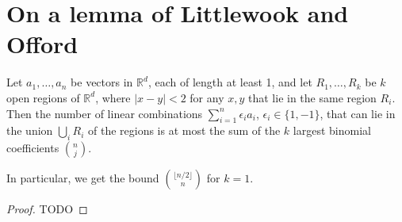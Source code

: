 \chapter{On a lemma of Littlewook and Offord}

\begin{theorem}
  \label{ch25theorem}
  Let $a_1, \dots, a_n$ be vectors in $\mathbb{R}^d$, each of length at least 1,
  and let $R_1, \dots, R_k$ be $k$ open regions of $\mathbb{R}^d$, where $|x - y| < 2$
  for any $x, y$ that lie in the same region $R_i$. Then the number of linear
  combinations $\sum_{i=1}^{n} \epsilon_i a_i$, $\epsilon_i \in \{1, -1\}$,
  that can lie in the union $\bigcup_i R_i$ of the regions is at most the sum of
  the $k$ largest binomial coefficients $\binom{n}{j}$.

  In particular, we get the bound $\binom{\lfloor n/2 \rfloor}{n}$ for $k = 1$.
\end{theorem}
\begin{proof}
  TODO
\end{proof}
